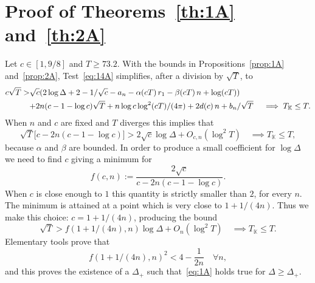 \documentclass[a4paper,11pt]{amsart}
\newcommand{\field}[1]{\mathbb{{#1}}}
\newcommand{\K}{\field{{K}}}
\theoremstyle{remark}
\begin{document}
\section{Proof of Theorems~\ref{th:1A} and~\ref{th:2A}}\label{sec:4A}
Let $c\in[1,9/8]$ and $T\geq 73.2$. With the bounds in Propositions~\ref{prop:1A} and~\ref{prop:2A},
Test~\eqref{eq:14A} simplifies, after a division by $\sqrt{T}$, to
%
\begin{align}
c \sqrt{T}
>&  \sqrt{c}(2\log \Delta + 2 - 1/\sqrt{c} - a_n - \alpha(cT)\,r_1 - \beta(cT)\,n + \log(cT))  \notag     \\
&  {+} 2n (c-1-\log c)\sqrt{T} + n\log c\log^2(cT)/(4\pi) + 2d(c)\,n + b_n/\sqrt{T}
\quad
\implies T_\K \leq T.                                                                          \label{eq:15A}
\end{align}
%
When $n$ and $c$ are fixed and $T$ diverges this implies that
\[
\sqrt{T}\big[c - 2n (c-1-\log c)\big]
>  2\sqrt{c} \log \Delta
   + O_{c,n}(\log^2 T)
\quad
\implies T_\K \leq T,
\]
because $\alpha$ and $\beta$ are bounded. In order to produce a small coefficient for $\log\Delta$ we
need to find $c$ giving a minimum for
\[
f(c,n):=\frac{2\sqrt{c}}{c - 2n (c-1-\log c)}.
\]
When $c$ is close enough to $1$ this quantity is strictly smaller than $2$, for every $n$.
The minimum is attained at a point which is very close to $1+1/(4n)$. Thus we make this choice: $c =
1+1/(4n)$, producing the bound
\[
\sqrt{T}
>  f(1+1/(4n),n) \log \Delta
   + O_{n}(\log^2 T)
\quad
\implies T_\K \leq T.
\]
%
Elementary tools prove that
\[
f(1+1/(4n),n)^2 < 4-\frac{1}{2n}
\quad\forall n,
\]
%
%
and this proves the existence of a $\Delta_+$ such that~\eqref{eq:1A} holds true for $\Delta \geq
\Delta_+$.
\end{document}
